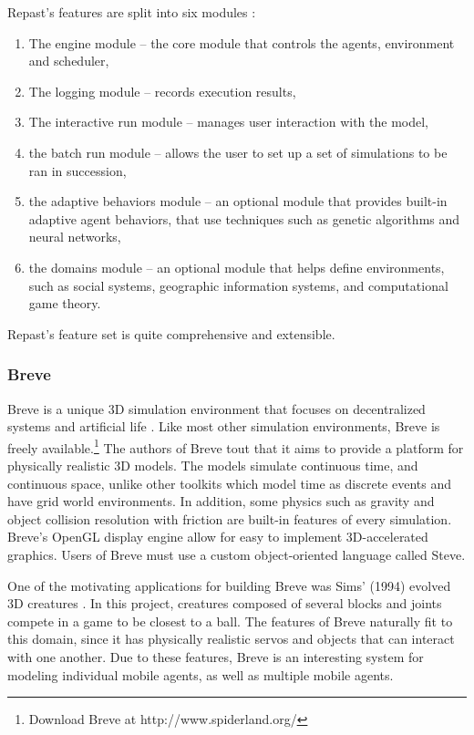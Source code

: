 Repast's features are split into six modules \cite{north2006experiences}:
\begin{enumerate}
   \item The engine module -- the core module that controls the agents, environment and scheduler,
   \item The logging module -- records execution results,
   \item The interactive run module -- manages user interaction with the model,
   \item the batch run module -- allows the user to set up a set of simulations to be ran in succession,
   \item the adaptive behaviors module -- an optional module that provides built-in adaptive agent behaviors, that use techniques such as genetic algorithms and neural networks,
   \item the domains module -- an optional module that helps define environments, such as social systems, geographic information systems, and computational game theory.
\end{enumerate}
Repast's feature set is quite comprehensive and extensible.
   
\subsubsection{Breve}
Breve is a unique 3D simulation environment that focuses on decentralized systems and artificial life \cite{kleinbreve}.
Like most other simulation environments, Breve is freely available.\footnote{Download Breve at http://www.spiderland.org/}
The authors of Breve tout that it aims to provide a platform for physically realistic 3D models.
The models simulate continuous time, and continuous space, unlike other toolkits which model time as discrete events and have grid world environments.
In addition, some physics such as gravity and object collision resolution with friction are built-in features of every simulation.
Breve's OpenGL display engine allow for easy to implement 3D-accelerated graphics.
Users of Breve must use a custom object-oriented language called Steve.


One of the motivating applications for building Breve was Sims' (1994) evolved 3D creatures \cite{kleinbreve}.
In this project, creatures composed of several blocks and joints compete in a game to be closest to a ball.
The features of Breve naturally fit to this domain, since it has physically realistic servos and objects that can interact with one another.
Due to these features, Breve is an interesting system for modeling individual mobile agents, as well as multiple mobile agents.



